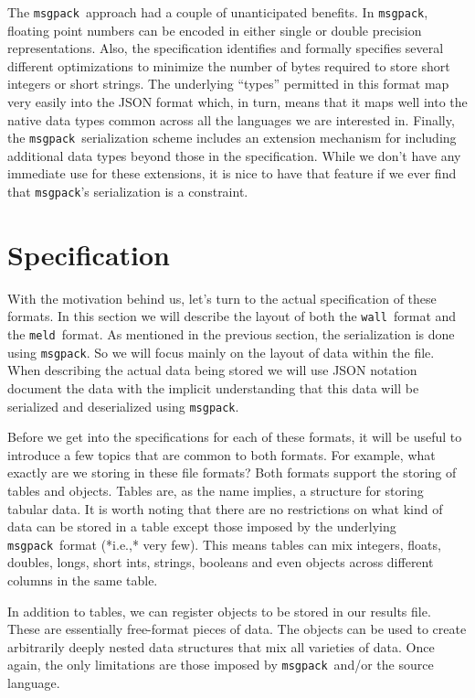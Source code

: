 \documentclass[11pt,a4paper,onecolumn]{article}
\newcommand{\wall}{\texttt{wall}}
\newcommand{\meld}{\texttt{meld}}
\newcommand{\msgpack}{\texttt{msgpack}}
\begin{document}
The \msgpack\ approach had a couple of unanticipated benefits.  In
\msgpack, floating point numbers can be encoded in either single or
double precision representations.  Also, the specification identifies
and formally specifies several different optimizations to minimize the
number of bytes required to store short integers or short strings.
The underlying ``types'' permitted in this format map very easily into
the JSON format which, in turn, means that it maps well into the
native data types common across all the languages we are interested
in.  Finally, the \msgpack\ serialization scheme includes an extension
mechanism for including additional data types beyond those in the
specification.  While we don't have any immediate use for these
extensions, it is nice to have that feature if we ever find that
\msgpack's serialization is a constraint.

\section{Specification}
\label{sec:spec}

With the motivation behind us, let's turn to the actual specification
of these formats.  In this section we will describe the layout of both
the \wall\ format and the \meld\ format.  As mentioned in the previous
section, the serialization is done using \msgpack.  So we will focus
mainly on the layout of data within the file.  When describing the
actual data being stored we will use JSON notation document the data
with the implicit understanding that this data will be serialized and
deserialized using \msgpack.


Before we get into the specifications for each of these formats, it
will be useful to introduce a few topics that are common to both
formats.  For example, what exactly are we storing in these file
formats?  Both formats support the storing of tables and objects.
Tables are, as the name implies, a structure for storing tabular
data.  It is worth noting that there are no restrictions on what kind
of data can be stored in a table except those imposed by the
underlying \msgpack\ format (*i.e.,* very few).  This means tables can
mix integers, floats, doubles, longs, short ints, strings, booleans
and even objects across different columns in the same table.

In addition to tables, we can register objects to be stored in our
results file.  These are essentially free-format pieces of data.  The
objects can be used to create arbitrarily deeply nested data
structures that mix all varieties of data.  Once again, the only
limitations are those imposed by \msgpack\ and/or the source language.
\end{document}
